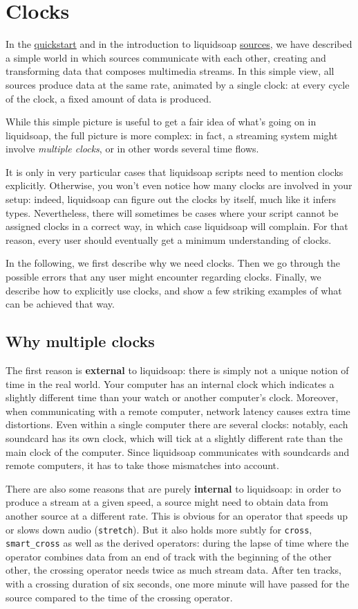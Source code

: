 \section{Clocks}
In the \href{quick_start.html}{quickstart} and in the introduction to liquidsoap
\href{sources.html}{sources}, we have described a simple world in which sources
communicate with each other, creating and transforming data that
composes multimedia streams.
In this simple view, all sources produce data at the same rate,
animated by a single clock: at every cycle of the clock,
a fixed amount of data is produced.

While this simple picture is useful to get a fair idea of what's going on
in liquidsoap, the full picture is more complex: in fact, a streaming
system might involve \emph{multiple clocks}, or in other words several
time flows.

It is only in very particular cases that liquidsoap scripts
need to mention clocks explicitly. Otherwise, you won't even notice
how many clocks are involved in your setup: indeed, liquidsoap can figure
out the clocks by itself, much like it infers types.
Nevertheless, there will sometimes be cases where your script cannot
be assigned clocks in a correct way, in which case liquidsoap will
complain. For that reason, every user should eventually get a minimum
understanding of clocks.

In the following, we first describe why we need clocks.
Then we go through the possible errors that any user might encounter
regarding clocks.
Finally, we describe how to explicitly use clocks,
and show a few striking examples of what can be achieved that way.

\subsection{Why multiple clocks}
The first reason is \textbf{external} to liquidsoap: there is simply
not a unique notion of time in the real world.
Your computer has an internal clock which indicates
a slightly different time than your watch or another computer's clock.
Moreover, when communicating with a remote computer, network
latency causes extra time distortions.
Even within a single computer there are several clocks: notably, each
soundcard has its own clock, which will tick at a slightly different
rate than the main clock of the computer.
Since liquidsoap communicates with soundcards and remote computers,
it has to take those mismatches into account.

There are also some reasons that are purely \textbf{internal} to liquidsoap:
in order to produce a stream at a given speed,
a source might need to obtain data from another source at
a different rate. This is obvious for an operator that speeds up or
slows down audio (\verb+stretch+). But it also holds more subtly
for \verb+cross+, \verb+smart_cross+ as well as the
derived operators: during the lapse of time where the operator combines
data from an end of track with the beginning of the other other,
the crossing operator needs twice as much stream data. After ten tracks,
with a crossing duration of six seconds, one more minute will have
passed for the source compared to the time of the crossing operator.


